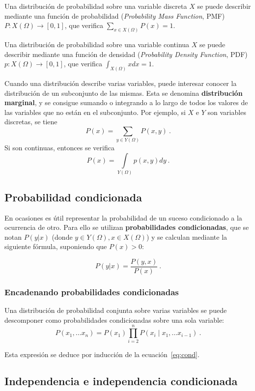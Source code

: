 Una distribución de probabilidad sobre una variable discreta \(X\) se
puede describir mediante una función de probabilidad (\emph{Probability
Mass Function}, PMF) \(P:X(\Omega)\rightarrow [0,1]\), que verifica
\(\sum_{x\in X(\Omega)} P(x)=1\).

Una distribución de probabilidad sobre una variable continua \(X\) se
puede describir mediante una función de densidad (\emph{Probability
Density Function}, PDF) \(p:X(\Omega)\rightarrow [0,1]\), que verifica
\(\int_{X(\Omega)} x dx=1\).

Cuando una distribución describe varias variables, puede interesar
conocer la distribución de un subconjunto de las mismas. Esta se
denomina \textbf{distribución marginal}, y se consigue sumando o
integrando a lo largo de todos los valores de las variables que no están
en el subconjunto. Por ejemplo, si \(X\) e \(Y\) son variables
discretas, se tiene \[P(x) = \sum_{y\in Y(\Omega)}P(x, y)~.\] Si son
continuas, entonces se verifica
\[P(x) = \int\limits_{Y(\Omega)}p(x, y)dy~.\]

\subsection{Probabilidad condicionada}\label{probabilidad-condicionada}

En ocasiones es útil representar la probabilidad de un suceso
condicionado a la ocurrencia de otro. Para ello se utilizan
\textbf{probabilidades condicionadas}, que se notan \(P(y|x)\) (donde
\(y\in Y(\Omega), x\in X(\Omega)\)) y se calculan mediante la siguiente
fórmula, suponiendo que \(P(x) > 0\):

\begin{equation}P(y|x)=\frac{P(y,x)}{P(x)}~.\label{eq:cond}\end{equation}

\subsubsection{Encadenando probabilidades
condicionadas}\label{encadenando-probabilidades-condicionadas}

Una distribución de probabilidad conjunta sobre varias variables se
puede descomponer como probabilidades condicionadas sobre una sola
variable:
\[P(x_1, \dots x_n) = P(x_1)\prod\limits_{i=2}^n P(x_i\mid x_1, \dots x_{i-1})~.\]

Esta expresión se deduce por inducción de la ecuación~\eqref{eq:cond}.

\subsection{Independencia e independencia
condicionada}\label{independencia-e-independencia-condicionada}

